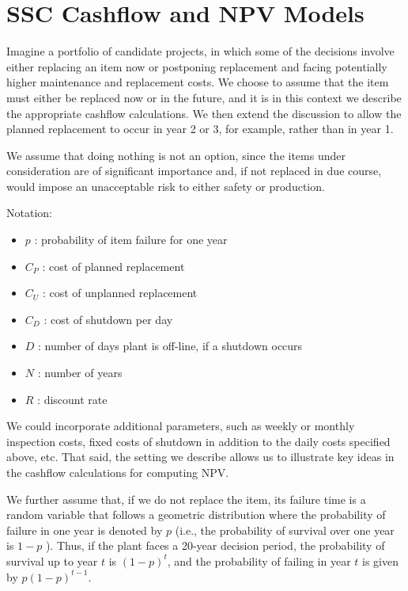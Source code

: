 \section{SSC Cashflow and NPV Models}
\label{sec:SSCNPV}

Imagine a portfolio of candidate projects, in which some of the decisions involve
either replacing an item now or postponing replacement and facing potentially higher
maintenance and replacement costs. We choose to assume that the item must either
be replaced now or in the future, and it is in this context we describe the
appropriate cashflow calculations. We then extend the discussion to allow the
planned replacement to occur in year 2 or 3, for example, rather than in year 1.

We assume that doing nothing is not an option, since the items under consideration
are of significant importance and, if not replaced in due course, would impose
an unacceptable risk to either safety or production.

Notation:

\begin{itemize}
	\item  \( p \) : probability of item failure for one year

	\item  \( C_{P} \) : cost of planned replacement

	\item  \( C_{U} \) : cost of unplanned replacement

	\item  \( C_{D} \) : cost of shutdown per day

	\item  \( D \) : number of days plant is off-line, if a shutdown occurs

	\item  \( N \) : number of years

	\item  \( R \) : discount rate
\end{itemize}


We could incorporate additional parameters, such as weekly or monthly inspection costs,
fixed costs of shutdown in addition to the daily costs specified above, etc. That said,
the setting we describe allows us to illustrate key ideas in the cashflow
calculations for computing NPV.

We further assume that, if we do not replace the item, its failure time is a random
variable that follows a geometric distribution where the probability of failure in
one year is denoted by  \( p \) (i.e., the probability of survival over one year
is  \( 1-p \) ). Thus, if the plant faces a 20-year decision period, the probability
of survival up to year  \( t \) is  \(  \left( 1-p \right) ^{t} \), and the probability
of failing in year  \( t \)  is given by  \( p \left( 1-p \right) ^{t-1} \).

